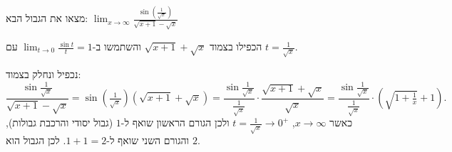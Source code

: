 
\begin{question}
מצאו את הגבול הבא:
$\displaystyle\lim_{x\to\infty}\frac{\sin\left(\frac{1}{\sqrt x}\right)}{\sqrt{x+1}-\sqrt x}$
\end{question}

\begin{hint}
הכפילו בצמוד $\sqrt{x+1}+\sqrt x$ והשתמשו ב-$\lim_{t\to0}\frac{\sin t}{t}=1$ עם $t=\frac1{\sqrt x}$.
\end{hint}

\begin{solution}
נכפיל ונחלק בצמוד:
\[ \frac{\sin\frac1{\sqrt x}}{\sqrt{x+1}-\sqrt x}=\sin\!\left(\tfrac1{\sqrt x}\right)\left(\sqrt{x+1}+\sqrt x\right)
=\frac{\sin\frac1{\sqrt x}}{\frac1{\sqrt x}}\cdot\frac{\sqrt{x+1}+\sqrt x}{\sqrt x}
=\frac{\sin\frac1{\sqrt x}}{\frac1{\sqrt x}}\cdot\left(\sqrt{1+\tfrac1x}+1\right). \]
כאשר $x\to\infty$, $t=\frac1{\sqrt x}\to0^+$ ולכן הגורם הראשון שואף ל-$1$ (גבול יסודי והרכבת גבולות), והגורם השני שואף ל-$1+1=2$. לכן הגבול הוא $\boxed{2}$.
\end{solution}
